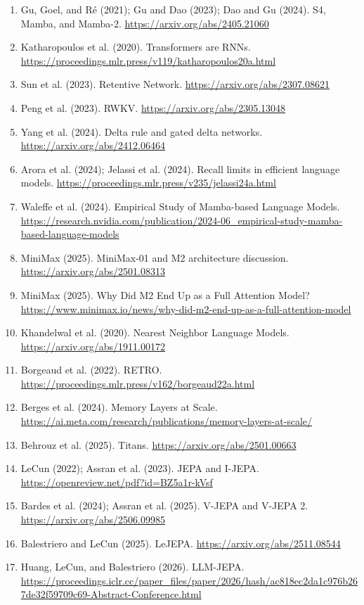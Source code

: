 \begin{enumerate}[leftmargin=*,itemsep=2pt]
\item Gu, Goel, and Ré (2021); Gu and Dao (2023); Dao and Gu (2024). S4, Mamba, and Mamba-2. \url{https://arxiv.org/abs/2405.21060}
\item Katharopoulos et al. (2020). Transformers are RNNs. \url{https://proceedings.mlr.press/v119/katharopoulos20a.html}
\item Sun et al. (2023). Retentive Network. \url{https://arxiv.org/abs/2307.08621}
\item Peng et al. (2023). RWKV. \url{https://arxiv.org/abs/2305.13048}
\item Yang et al. (2024). Delta rule and gated delta networks. \url{https://arxiv.org/abs/2412.06464}
\item Arora et al. (2024); Jelassi et al. (2024). Recall limits in efficient language models. \url{https://proceedings.mlr.press/v235/jelassi24a.html}
\item Waleffe et al. (2024). Empirical Study of Mamba-based Language Models. \url{https://research.nvidia.com/publication/2024-06_empirical-study-mamba-based-language-models}
\item MiniMax (2025). MiniMax-01 and M2 architecture discussion. \url{https://arxiv.org/abs/2501.08313}
\item MiniMax (2025). Why Did M2 End Up as a Full Attention Model? \url{https://www.minimax.io/news/why-did-m2-end-up-as-a-full-attention-model}
\item Khandelwal et al. (2020). Nearest Neighbor Language Models. \url{https://arxiv.org/abs/1911.00172}
\item Borgeaud et al. (2022). RETRO. \url{https://proceedings.mlr.press/v162/borgeaud22a.html}
\item Berges et al. (2024). Memory Layers at Scale. \url{https://ai.meta.com/research/publications/memory-layers-at-scale/}
\item Behrouz et al. (2025). Titans. \url{https://arxiv.org/abs/2501.00663}
\item LeCun (2022); Assran et al. (2023). JEPA and I-JEPA. \url{https://openreview.net/pdf?id=BZ5a1r-kVsf}
\item Bardes et al. (2024); Assran et al. (2025). V-JEPA and V-JEPA 2. \url{https://arxiv.org/abs/2506.09985}
\item Balestriero and LeCun (2025). LeJEPA. \url{https://arxiv.org/abs/2511.08544}
\item Huang, LeCun, and Balestriero (2026). LLM-JEPA. \url{https://proceedings.iclr.cc/paper_files/paper/2026/hash/ac818ec2da1c976b267de32f59709c69-Abstract-Conference.html}

\end{enumerate}
